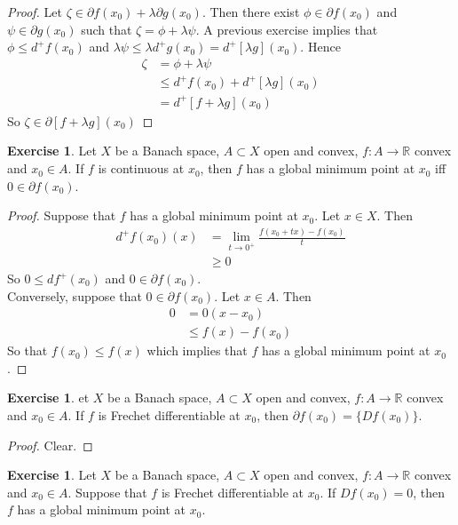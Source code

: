 \documentclass[12pt]{amsart}
\theoremstyle{definition}
\newtheorem{ex}[definition]{Exercise}
\newcommand{\lam}{\lambda}
\newcommand{\R}{\mathbb{R}}
\newcommand{\p}{\partial}
\DeclareMathOperator*{\0}{\mbf{0}}
\DeclareMathOperator*{\1}{\mbf{1}}
\newcommand{\lex}[1]{\label{ex:#1}}
\begin{document}
	\begin{proof}
	Let $\zeta \in \p f(x_0) + \lam \p g(x_0)$. Then there exist $\phi \in \p f(x_0)$ and $\psi \in \p g(x_0)$ such that $\zeta = \phi + \lam \psi$. A previous exercise implies that $\phi \leq d^+f(x_0)$ and $\lam \psi \leq \lam d^+g(x_0) = d^+[\lam g](x_0)$. Hence 
	\begin{align*}
	\zeta
	&= \phi + \lam \psi \\
	&\leq d^+f(x_0) + d^+[\lam g](x_0) \\
	&= d^+[f + \lam g](x_0)
	\end{align*}
	So $\zeta \in \p [f+\lam g](x_0)$
	\end{proof}
	
	\begin{ex} \lex{}
	Let $X$ be a Banach space, $A \subset X$ open and convex, $f:A \rightarrow \R$ convex and $x_0 \in A$. If $f$ is continuous at $x_0$, then $f$ has a global minimum point at $x_0$ iff $0 \in \p f(x_0)$.
	\end{ex}
	
	\begin{proof}
	Suppose that $f$ has a global minimum point at $x_0$. Let $x \in X$. Then 
	\begin{align*}
	d^+f(x_0)(x) 
	&= \lim_{t \rightarrow 0^+} \frac{f(x_0 + tx) - f(x_0)}{t} \\
	& \geq 0
	\end{align*}
	So $0 \leq df^+(x_0)$ and $0 \in \p f(x_0)$.\\
	Conversely, suppose that $0 \in \p f(x_0)$. Let $x \in A$. Then 
	\begin{align*}
	0
	& = 0(x - x_0) \\
	& \leq f(x) - f(x_0)
	\end{align*}
	So that $f(x_0) \leq f(x)$ which implies that $f$ has a global minimum point at $x_0$.
	\end{proof}
	
	\begin{ex}
	et $X$ be a Banach space, $A \subset X$ open and convex, $f:A \rightarrow \R$ convex and $x_0 \in A$. If $f$ is Frechet differentiable at $x_0$, then $\p f(x_0) = \{Df(x_0)\}$. 
	\end{ex}	
	
	\begin{proof}
	Clear.
	\end{proof}
	
	\begin{ex}
	Let $X$ be a Banach space, $A \subset X$ open and convex, $f:A \rightarrow \R$ convex and $x_0 \in A$. Suppose that $f$ is Frechet differentiable at $x_0$. If $Df(x_0) = 0$, then $f$ has a global minimum point at $x_0$. 
	\end{ex}
	
\end{document}
